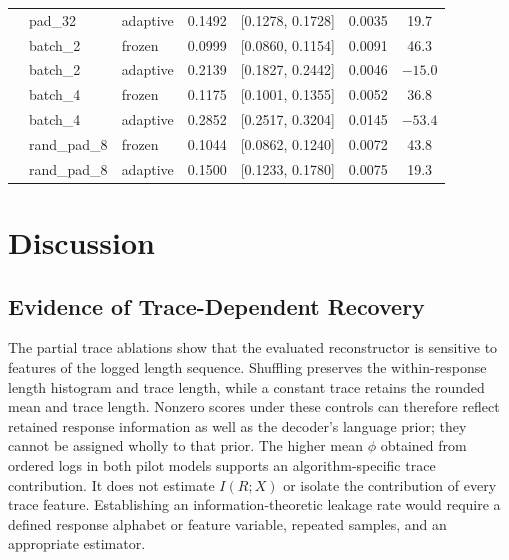 \documentclass[electronics,article,submit,pdftex,moreauthors]{Definitions/mdpi}
\begin{document}
\begin{table}[ht]
{\begin{tabular}{l l l c c c c}
 & pad\_32 & adaptive & 0.1492 & [0.1278, 0.1728] & 0.0035 & 19.7 \\
 & batch\_2 & frozen & 0.0999 & [0.0860, 0.1154] & 0.0091 & 46.3 \\
 & batch\_2 & adaptive & 0.2139 & [0.1827, 0.2442] & 0.0046 & $-15.0$ \\
 & batch\_4 & frozen & 0.1175 & [0.1001, 0.1355] & 0.0052 & 36.8 \\
 & batch\_4 & adaptive & 0.2852 & [0.2517, 0.3204] & 0.0145 & $-53.4$ \\
 & rand\_pad\_8 & frozen & 0.1044 & [0.0862, 0.1240] & 0.0072 & 43.8 \\
 & rand\_pad\_8 & adaptive & 0.1500 & [0.1233, 0.1780] & 0.0075 & 19.3 \\
\bottomrule
\end{tabular}%
}
\end{table}

\section{Discussion}
\subsection{Evidence of Trace-Dependent Recovery}
The partial trace ablations show that the evaluated reconstructor is sensitive to features of the logged length sequence. Shuffling preserves the within-response length histogram and trace length, while a constant trace retains the rounded mean and trace length. Nonzero scores under these controls can therefore reflect retained response information as well as the decoder's language prior; they cannot be assigned wholly to that prior. The higher mean $\phi$ obtained from ordered logs in both pilot models supports an algorithm-specific trace contribution. It does not estimate $I(R;X)$ or isolate the contribution of every trace feature. Establishing an information-theoretic leakage rate would require a defined response alphabet or feature variable, repeated samples, and an appropriate estimator.
\end{document}
